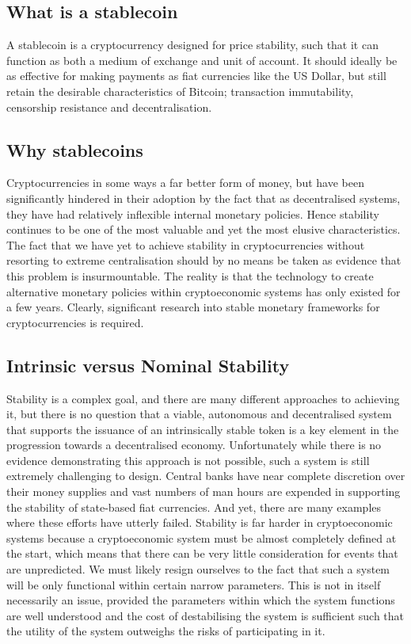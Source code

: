 \subsection{What is a stablecoin}

\noindent A stablecoin is a cryptocurrency designed for price stability, such that it can function as both a medium of exchange and unit of account. It should ideally be as effective for making payments as fiat currencies like the US Dollar, but still retain the desirable characteristics of Bitcoin; transaction immutability, censorship resistance and decentralisation. \\

\subsection{Why stablecoins}

\noindent Cryptocurrencies in some ways a far better form of money, but have been significantly hindered in their adoption by the fact that as decentralised systems, they have had relatively inflexible internal monetary policies. Hence stability continues to be one of the most valuable and yet the most elusive characteristics. The fact that we have yet to achieve stability in cryptocurrencies without resorting to extreme centralisation should by no means be taken as evidence that this problem is insurmountable. The reality is that the technology to create alternative monetary policies within cryptoeconomic systems has only existed for a few years. Clearly, significant research into stable monetary frameworks for cryptocurrencies is required. \\

\subsection{Intrinsic versus Nominal Stability}

\noindent Stability is a complex goal, and there are many different approaches to achieving it, but there is no question that a viable, autonomous and decentralised system that supports the issuance of an intrinsically stable token is a key element in the progression towards a decentralised economy. Unfortunately while there is no evidence demonstrating this approach is not possible, such a system is still extremely challenging to design. Central banks have near complete discretion over their money supplies and vast numbers of man hours are expended in supporting the stability of state-based fiat currencies. And yet, there are many examples where these efforts have utterly failed. Stability is far harder in cryptoeconomic systems because a cryptoeconomic system must be almost completely defined at the start, which means that there can be very little consideration for events that are unpredicted. We must likely resign ourselves to the fact that such a system will be only functional within certain narrow parameters. This is not in itself necessarily an issue, provided the parameters within which the system functions are well understood and the cost of destabilising the system is sufficient such that the utility of the system outweighs the risks of participating in it. \\

